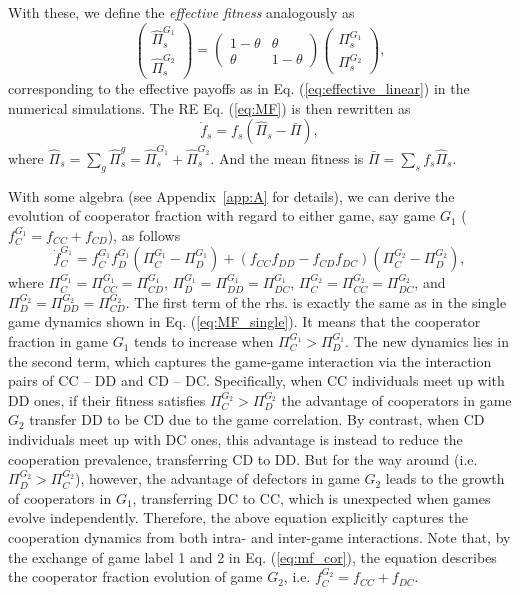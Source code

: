 \documentclass[showpacs,superscriptaddress,reprint,nofootinbib,amsmath,amssymb,aps,pre]{revtex4-1}
\begin{document}
With these, we define the \emph{effective fitness} analogously as 
\begin{equation}
\begin{pmatrix}
\widehat\Pi^{G_1}_{s} \\ \widehat\Pi^{G_2}_{s} 
\end{pmatrix}
=
\begin{pmatrix}
1\!-\!\theta & \theta \\
\theta & 1\!-\!\theta\!  
\end{pmatrix}
\begin{pmatrix}
\Pi^{G_1}_{s} \\ \Pi^{G_2}_{s} 
\end{pmatrix},
\label{eq:effective_fitness}
\end{equation}
corresponding to the effective payoffs as in Eq.  (\ref{eq:effective_linear}) in the numerical simulations.
The RE Eq. (\ref{eq:MF}) is then rewritten as 
\begin{equation}
\dot{{f}}_{s}=f_{s}(\widehat{\Pi}_{s}-\bar{\Pi}),
\label{eq:MF_RE}
\end{equation}
where $\widehat{\Pi}_{s}=\sum_{g}\widehat{\Pi}_{s}^{g}=\widehat{\Pi}_{s}^{G_1}+\widehat{\Pi}_{s}^{G_2}$. And the mean fitness is
$\bar{\Pi}=\sum_{s}f_{s}\widehat{\Pi}_{s}$.

With some algebra (see Appendix~\ref{app:A} for details), we can derive the evolution of cooperator fraction with regard to either game, say game $G_1$ ($f^{G_1}_C=f_{CC}+f_{CD}$), as follows 
\small
\begin{equation}
\dot{f}^{G_1}_{C}=f^{G_1}_{C}f^{G_1}_{D}(\Pi^{G_1}_C-\Pi^{G_1}_D) + (f_{CC}f_{DD}-f_{CD}f_{DC})(\Pi^{G_2}_C-\Pi^{G_2}_D), 
\label{eq:mf_cor}
\end{equation}
\normalsize
where $\Pi^{G_1}_C\!=\!\Pi^{G_1}_{CC}\!=\!\Pi^{G_1}_{CD}$, $\Pi^{G_1}_D\!=\!\Pi^{G_1}_{DD}=\Pi^{G_1}_{DC}$, $\Pi^{G_2}_C=\Pi^{G_2}_{CC}=\Pi^{G_2}_{DC}$, and $\Pi^{G_2}_D=\Pi^{G_2}_{DD}=\Pi^{G_2}_{CD}$. The first term of the rhs. is exactly the same as in the single game dynamics shown in Eq. (\ref{eq:MF_single}). It means that the cooperator fraction in game $G_1$ tends to increase when $\Pi^{G_1}_C>\Pi^{G_1}_D$.
The new dynamics lies in the second term, which captures the game-game interaction via the interaction pairs of CC -- DD and CD -- DC.  Specifically, when CC individuals meet up with DD ones, if their fitness satisfies $\Pi^{G_2}_C>\Pi^{G_2}_D$ the advantage of cooperators in game $G_2$ transfer DD to be CD due to the game correlation. By contrast, when CD individuals meet up with DC ones, this advantage is instead to reduce the cooperation prevalence, transferring CD to DD. But for the way around (i.e. $\Pi^{G_2}_D>\Pi^{G_2}_C$), however, the advantage of defectors in game $G_2$ leads to the growth of cooperators in $G_1$, transferring DC to CC, which is unexpected when games evolve independently. Therefore, the above equation explicitly captures the cooperation dynamics from both intra- and inter-game interactions. Note that, by the exchange of game label 1 and 2 in Eq. (\ref{eq:mf_cor}), the equation describes the cooperator fraction evolution of game $G_2$, i.e. $f^{G_2}_{C} = f_{CC}+f_{DC}$.
\end{document}
